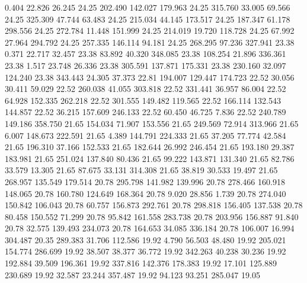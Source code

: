    0.404   22.826   26.245        24.25
 202.490  142.027  179.963        24.25
 315.760   33.005   69.566        24.25
 325.309   47.744   63.483        24.25
 215.034   44.145  173.517        24.25
 187.347   61.178  298.556        24.25
 272.784   11.448  151.999        24.25
 214.019   19.720  118.728        24.25
  67.992   27.964  294.792        24.25
 257.335  146.114   94.181        24.25
 268.295   97.236  327.941        23.38
   0.371   22.717   32.457        23.38
  83.892   40.320  348.085        23.38
 108.254   21.896  336.361        23.38
   1.517   23.748   26.336        23.38
 305.591  137.871  175.331        23.38
 230.160   32.097  124.240        23.38
 343.443   24.305   37.373        22.81
 194.007  129.447  174.723        22.52
  30.056   30.411   59.029        22.52
 260.038   41.055  303.818        22.52
 331.441   36.957   86.004        22.52
  64.928  152.335  262.218        22.52
 301.555  149.482  119.565        22.52
 166.114  132.543  144.857        22.52
  36.215  157.609  246.133        22.52
  60.450   46.725    7.836        22.52
 240.789  149.186  358.750        21.65
 154.034   71.907  153.556        21.65
 249.569   72.914  313.966        21.65
   6.007  148.673  222.591        21.65
   4.389  144.791  224.333        21.65
  37.205   77.774   42.584        21.65
 196.310   37.166  152.533        21.65
 182.644   26.992  246.454        21.65
 193.180   29.387  183.981        21.65
 251.024  137.840   80.436        21.65
  99.222  143.871  131.340        21.65
  82.786   33.579   13.305        21.65
  87.675   33.131  314.308        21.65
  38.819   30.533   19.497        21.65
 268.957  135.549  179.514        20.78
 295.798  141.982  139.996        20.78
 278.466  160.918  148.065        20.78
 160.780  124.649  168.364        20.78
   9.020   28.856    1.739        20.78
 274.040  150.842  106.043        20.78
  60.757  156.873  292.761        20.78
 298.818  156.405  137.538        20.78
  80.458  150.552   71.299        20.78
  95.842  161.558  283.738        20.78
 203.956  156.887   91.840        20.78
  32.575  139.493  234.073        20.78
 164.653   34.085  336.184        20.78
 106.007   16.994  304.487        20.35
 289.383   31.706  112.586        19.92
   4.790   56.503   48.480        19.92
 205.021  154.774  286.699        19.92
  38.507   38.377   36.772        19.92
 342.263   40.238   30.236        19.92
 192.884   39.509  196.361        19.92
 337.816  142.376  178.383        19.92
  17.101  125.889  230.689        19.92
  32.587   23.244  357.487        19.92
  94.123   93.251  285.047        19.05
